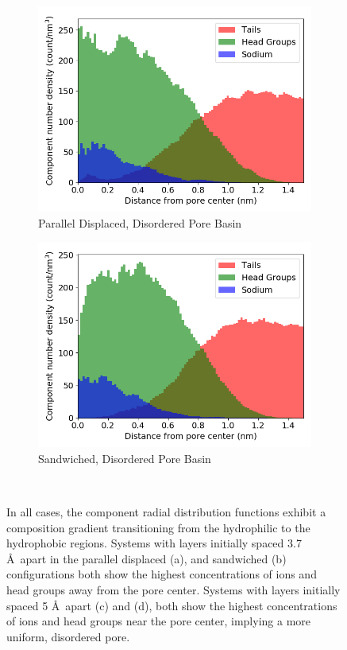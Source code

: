 \documentclass[journal=jpcbfk,manusciprt=article]{achemso}
\begin{document}
\begin{figure}[!htb]
\begin{subfigure}{0.47\textwidth}
        \includegraphics[width=1\linewidth]{disordered_offset_density.png}
        \caption{Parallel Displaced, Disordered Pore Basin}
        \label{fig:disordered_offset_density}
  \end{subfigure}
  \begin{subfigure}{0.47\textwidth}
        \includegraphics[width=1\linewidth]{disordered_density.png}
        \caption{Sandwiched, Disordered Pore Basin}
        \label{fig:disorder_layered_density}
  \end{subfigure}
  \caption{In all cases, the component radial distribution functions exhibit a
	  composition gradient transitioning from the hydrophilic to the hydrophobic
	  regions. Systems with layers initially spaced 3.7 \AA~apart in the  parallel
	  displaced (a), and sandwiched (b) configurations both show the highest
	  concentrations of ions and head groups away from the pore center. Systems with
	  layers initially spaced 5 \AA~apart (c) and (d), both show the highest
	  concentrations of ions and head groups near the pore center, implying a more
	  uniform, disordered pore.}~\label{fig:densities}
  \end{figure}
\end{document}
